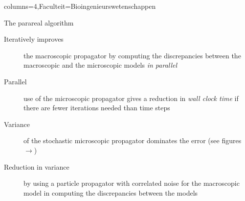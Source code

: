 \documentclass[landscape,a0paper,fontscale=0.45]{kuleuvenposter}
\begin{document}
\begin{poster}{columns=4,Faculteit=Bioingenieurswetenschappen}
\begin{posterbox}%
[name=parareal micro-macro, column=1, above=bottom, boxColorOne=KULeuvenFaculteit!15!white, borderColor=KULeuvenFaculteit]%
{The parareal algorithm}
\begin{description}
\item[Iteratively improves] the macroscopic propagator by computing the discrepancies between the {\color{KULeuvenBlauw}macroscopic} and the {\color{KULeuvenFaculteit}microscopic} models \emph{in parallel}
\item[Parallel] use of the microscopic propagator gives a reduction in \emph{wall clock time} if there are fewer iterations needed than time steps
\item[Variance] of the stochastic microscopic propagator dominates the error (see figures $\rightarrow$)%
\item[Reduction in variance] by using a particle propagator with {\color{KULeuvenSecundair}correlated noise} for the macroscopic model in computing the discrepancies between the models
\end{description}

\end{posterbox}


\end{poster}
\end{document}
